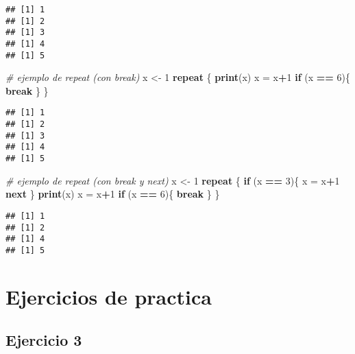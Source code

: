 \documentclass[]{book}
\newenvironment{Shaded}{\begin{snugshade}}{\end{snugshade}}
\newcommand{\CommentTok}[1]{\textcolor[rgb]{0.56,0.35,0.01}{\textit{#1}}}
\newcommand{\ControlFlowTok}[1]{\textcolor[rgb]{0.13,0.29,0.53}{\textbf{#1}}}
\newcommand{\DecValTok}[1]{\textcolor[rgb]{0.00,0.00,0.81}{#1}}
\newcommand{\KeywordTok}[1]{\textcolor[rgb]{0.13,0.29,0.53}{\textbf{#1}}}
\newcommand{\NormalTok}[1]{#1}
\newcommand{\OperatorTok}[1]{\textcolor[rgb]{0.81,0.36,0.00}{\textbf{#1}}}
\newcommand{\StringTok}[1]{\textcolor[rgb]{0.31,0.60,0.02}{#1}}
\begin{document}
\begin{verbatim}
## [1] 1
## [1] 2
## [1] 3
## [1] 4
## [1] 5
\end{verbatim}

\begin{Shaded}
\begin{Highlighting}[]
\CommentTok{# ejemplo de repeat (con break)}
\NormalTok{x <-}\StringTok{ }\DecValTok{1}
\ControlFlowTok{repeat}\NormalTok{ \{}
  \KeywordTok{print}\NormalTok{(x)}
\NormalTok{  x =}\StringTok{ }\NormalTok{x}\OperatorTok{+}\DecValTok{1}
  \ControlFlowTok{if}\NormalTok{ (x }\OperatorTok{==}\StringTok{ }\DecValTok{6}\NormalTok{)\{}
  \ControlFlowTok{break}
\NormalTok{  \}}
\NormalTok{\}}
\end{Highlighting}
\end{Shaded}

\begin{verbatim}
## [1] 1
## [1] 2
## [1] 3
## [1] 4
## [1] 5
\end{verbatim}

\begin{Shaded}
\begin{Highlighting}[]
\CommentTok{# ejemplo de repeat (con break y next)}
\NormalTok{x <-}\StringTok{ }\DecValTok{1}
\ControlFlowTok{repeat}\NormalTok{ \{}
  \ControlFlowTok{if}\NormalTok{ (x }\OperatorTok{==}\StringTok{ }\DecValTok{3}\NormalTok{)\{}
\NormalTok{    x =}\StringTok{ }\NormalTok{x}\OperatorTok{+}\DecValTok{1}
    \ControlFlowTok{next}
\NormalTok{  \}}
  \KeywordTok{print}\NormalTok{(x)}
\NormalTok{  x =}\StringTok{ }\NormalTok{x}\OperatorTok{+}\DecValTok{1}
  \ControlFlowTok{if}\NormalTok{ (x }\OperatorTok{==}\StringTok{ }\DecValTok{6}\NormalTok{)\{}
  \ControlFlowTok{break}
\NormalTok{  \}}
\NormalTok{\}}
\end{Highlighting}
\end{Shaded}

\begin{verbatim}
## [1] 1
## [1] 2
## [1] 4
## [1] 5
\end{verbatim}

\hypertarget{ejercicios-de-practica-1}{%
\section{Ejercicios de practica}\label{ejercicios-de-practica-1}}

\hypertarget{ejercicio-3}{%
\subsection{Ejercicio 3}\label{ejercicio-3}}
\end{document}
